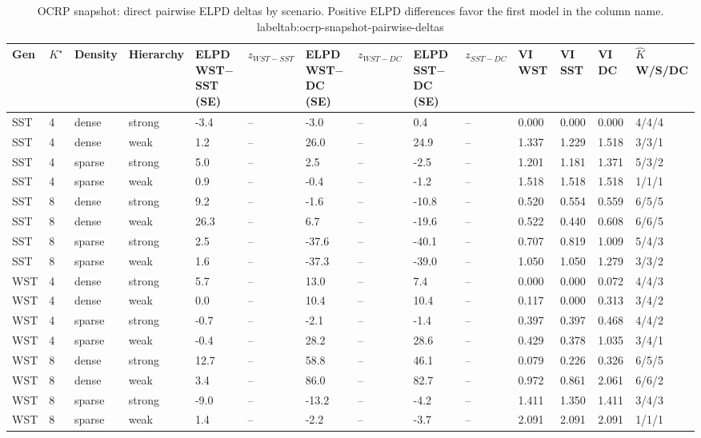 \begin{table}[!h]
\centering
\caption{OCRP snapshot: direct pairwise ELPD deltas by scenario. Positive ELPD differences favor the first model in the column name.\\label{tab:ocrp-snapshot-pairwise-deltas}}
\centering
\begin{tabular}[t]{llllllllllllll}
\toprule
Gen & $K^\star$ & Density & Hierarchy & ELPD WST$-$SST (SE) & $z_{WST-SST}$ & ELPD WST$-$DC (SE) & $z_{WST-DC}$ & ELPD SST$-$DC (SE) & $z_{SST-DC}$ & VI WST & VI SST & VI DC & $\hat K$ W/S/DC\\
\midrule
SST & 4 & dense & strong & -3.4 & -- & -3.0 & -- & 0.4 & -- & 0.000 & 0.000 & 0.000 & 4/4/4\\
SST & 4 & dense & weak & 1.2 & -- & 26.0 & -- & 24.9 & -- & 1.337 & 1.229 & 1.518 & 3/3/1\\
SST & 4 & sparse & strong & 5.0 & -- & 2.5 & -- & -2.5 & -- & 1.201 & 1.181 & 1.371 & 5/3/2\\
SST & 4 & sparse & weak & 0.9 & -- & -0.4 & -- & -1.2 & -- & 1.518 & 1.518 & 1.518 & 1/1/1\\
SST & 8 & dense & strong & 9.2 & -- & -1.6 & -- & -10.8 & -- & 0.520 & 0.554 & 0.559 & 6/5/5\\
SST & 8 & dense & weak & 26.3 & -- & 6.7 & -- & -19.6 & -- & 0.522 & 0.440 & 0.608 & 6/6/5\\
SST & 8 & sparse & strong & 2.5 & -- & -37.6 & -- & -40.1 & -- & 0.707 & 0.819 & 1.009 & 5/4/3\\
SST & 8 & sparse & weak & 1.6 & -- & -37.3 & -- & -39.0 & -- & 1.050 & 1.050 & 1.279 & 3/3/2\\
WST & 4 & dense & strong & 5.7 & -- & 13.0 & -- & 7.4 & -- & 0.000 & 0.000 & 0.072 & 4/4/3\\
WST & 4 & dense & weak & 0.0 & -- & 10.4 & -- & 10.4 & -- & 0.117 & 0.000 & 0.313 & 3/4/2\\
WST & 4 & sparse & strong & -0.7 & -- & -2.1 & -- & -1.4 & -- & 0.397 & 0.397 & 0.468 & 4/4/2\\
WST & 4 & sparse & weak & -0.4 & -- & 28.2 & -- & 28.6 & -- & 0.429 & 0.378 & 1.035 & 3/4/1\\
WST & 8 & dense & strong & 12.7 & -- & 58.8 & -- & 46.1 & -- & 0.079 & 0.226 & 0.326 & 6/5/5\\
WST & 8 & dense & weak & 3.4 & -- & 86.0 & -- & 82.7 & -- & 0.972 & 0.861 & 2.061 & 6/6/2\\
WST & 8 & sparse & strong & -9.0 & -- & -13.2 & -- & -4.2 & -- & 1.411 & 1.350 & 1.411 & 3/4/3\\
WST & 8 & sparse & weak & 1.4 & -- & -2.2 & -- & -3.7 & -- & 2.091 & 2.091 & 2.091 & 1/1/1\\
\bottomrule
\end{tabular}
\end{table}

